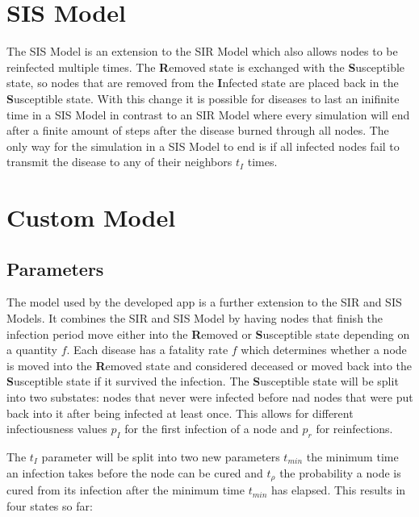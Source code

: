 \section{SIS Model}
The SIS Model is an extension to the SIR Model which also allows nodes to be reinfected multiple
times. The \textbf{R}emoved state is exchanged with the \textbf{S}usceptible state, so nodes
that are removed from the \textbf{I}nfected state are placed back in the \textbf{S}usceptible state.
With this change it is possible for diseases to last an inifinite time in a SIS Model in contrast
to an SIR Model where every simulation will end after a finite amount of steps after the 
disease burned through all nodes. The only way for the simulation in a SIS Model to end is
if all infected nodes fail to transmit the disease to any of their neighbors $t_I$ times.

\section{Custom Model}
\subsection{Parameters}
The model used by the developed app is a further extension to the SIR and SIS Models. It 
combines the SIR and SIS Model by having nodes that finish the infection period move either
into the \textbf{R}emoved or \textbf{S}usceptible state depending on a quantity $f$. Each
disease has a fatality rate $f$ which determines whether a node is moved into the 
\textbf{R}emoved state and considered deceased or moved back into the \textbf{S}usceptible
state if it survived the infection. The \textbf{S}usceptible state will be split into two
substates: nodes that never were infected before nad nodes that were put back into it after
being infected at least once. This allows for different infectiousness values $p_I$ for the
first infection of a node and $p_r$ for reinfections. 

The $t_I$ parameter will be split into two new parameters $t_{min}$ the minimum time an infection takes
before the node can be cured and $t_\rho$ the probability a node is cured from its infection
after the minimum time $t_{min}$ has elapsed. This results in four states so far:

